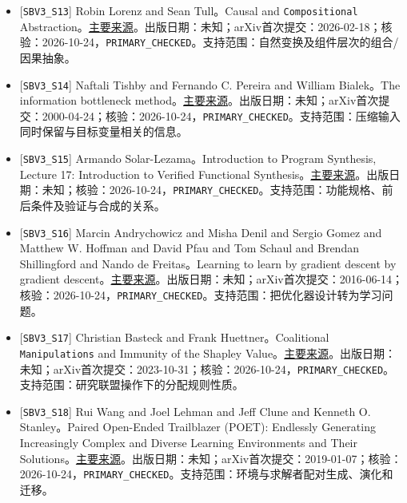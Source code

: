 \documentclass[
  10pt,
]{article}
\begin{document}
\begin{itemize}
  Icard and Christopher Potts。Causal Abstractions of Neural
  Networks。\href{https://arxiv.org/abs/2106.02997}{主要来源}。出版日期：未知；arXiv首次提交：2021-06-06；核验：2026-10-24，\nolinkurl{PRIMARY_CHECKED}。支持范围：以因果抽象解释高层变量与神经行为的对应。
\item
  {[}\nolinkurl{SBV3_S13}{]} Robin Lorenz and Sean Tull。Causal and
  \nolinkurl{Compositional}
  Abstraction。\href{https://arxiv.org/abs/2602.16612}{主要来源}。出版日期：未知；arXiv首次提交：2026-02-18；核验：2026-10-24，\nolinkurl{PRIMARY_CHECKED}。支持范围：自然变换及组件层次的组合/因果抽象。
\item
  {[}\nolinkurl{SBV3_S14}{]} Naftali Tishby and Fernando C. Pereira and
  William Bialek。The information bottleneck
  method。\href{https://arxiv.org/abs/physics/0004057}{主要来源}。出版日期：未知；arXiv首次提交：2000-04-24；核验：2026-10-24，\nolinkurl{PRIMARY_CHECKED}。支持范围：压缩输入同时保留与目标变量相关的信息。
\item
  {[}\nolinkurl{SBV3_S15}{]} Armando Solar-Lezama。Introduction to
  Program Synthesis, Lecture 17: Introduction to Verified Functional
  Synthesis。\href{https://people.csail.mit.edu/asolar/SynthesisCourse/Lecture17.htm}{主要来源}。出版日期：未知；核验：2026-10-24，\nolinkurl{PRIMARY_CHECKED}。支持范围：功能规格、前后条件及验证与合成的关系。
\item
  {[}\nolinkurl{SBV3_S16}{]} Marcin Andrychowicz and Misha Denil and
  Sergio Gomez and Matthew W. Hoffman and David Pfau and Tom Schaul and
  Brendan Shillingford and Nando de Freitas。Learning to learn by
  gradient descent by gradient
  descent。\href{https://arxiv.org/abs/1606.04474}{主要来源}。出版日期：未知；arXiv首次提交：2016-06-14；核验：2026-10-24，\nolinkurl{PRIMARY_CHECKED}。支持范围：把优化器设计转为学习问题。
\item
  {[}\nolinkurl{SBV3_S17}{]} Christian Basteck and Frank
  Huettner。Coalitional \nolinkurl{Manipulations} and Immunity of the
  Shapley
  Value。\href{https://arxiv.org/abs/2310.20415}{主要来源}。出版日期：未知；arXiv首次提交：2023-10-31；核验：2026-10-24，\nolinkurl{PRIMARY_CHECKED}。支持范围：研究联盟操作下的分配规则性质。
\item
  {[}\nolinkurl{SBV3_S18}{]} Rui Wang and Joel Lehman and Jeff Clune and
  Kenneth O. Stanley。Paired Open-Ended Trailblazer (POET): Endlessly
  Generating Increasingly Complex and Diverse Learning Environments and
  Their
  Solutions。\href{https://arxiv.org/abs/1901.01753}{主要来源}。出版日期：未知；arXiv首次提交：2019-01-07；核验：2026-10-24，\nolinkurl{PRIMARY_CHECKED}。支持范围：环境与求解者配对生成、演化和迁移。

\end{itemize}
\end{document}
